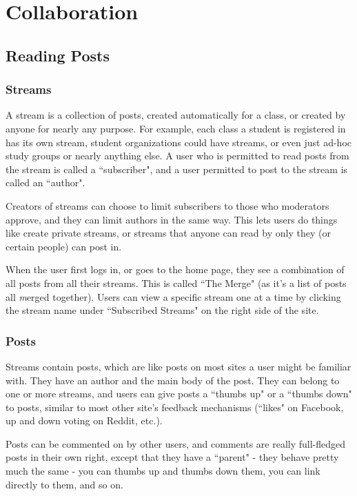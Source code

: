 \documentclass[titlepage]{article}
\begin{document}
\section{Collaboration}
\subsection{Reading Posts}
\subsubsection{Streams}
A stream is a collection of posts, created automatically for a class, or created by anyone for nearly any purpose. For example, each class a student is registered in has its own stream, student organizations could have streams, or even just ad-hoc study groups or nearly anything else. A user who is permitted to read posts from the stream is called a ``\gls{subscriber}", and a user permitted to post to the stream is called an ``\gls{author}".

Creators of streams can choose to limit subscribers to those who moderators approve, and they can limit authors in the same way. This lets users do things like create private streams, or streams that anyone can read by only they (or certain people) can post in.

When the user first logs in, or goes to the home page, they see a combination of all posts from all their streams. This is called ``The Merge" (as it's a list of posts all {\emph merged} together). Users can view a specific stream one at a time by clicking the stream name under ``Subscribed Streams" on the right side of the site.

\subsubsection{Posts}
Streams contain posts, which are like posts on most sites a user might be familiar with. They have an \gls{author} and the main body of the post. They can belong to one or more streams, and users can give posts a ``thumbs up" or a ``thumbs down" to posts, similar to most other site's feedback mechanisms (``likes" on Facebook, up and down voting on Reddit, etc.). 

Posts can be commented on by other users, and comments are really full-fledged posts in their own right, except that they have a ``parent" - they behave pretty much the same - you can thumbs up and thumbs down them, you can link directly to them, and so on.
\end{document}
